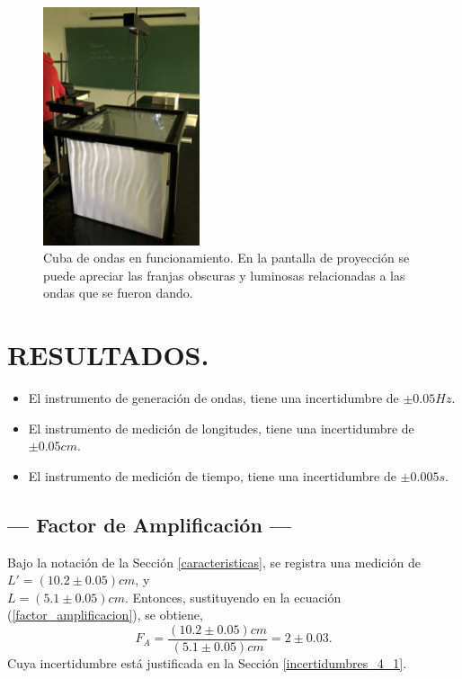 \documentclass[12pt,a4paper]{article}
\begin{document}
\begin{figure}[ht]
	\centering
	\includegraphics[height = 7cm]{IMAGENES/images/image5}
	\caption{Cuba de ondas en funcionamiento. En la pantalla de proyección se puede apreciar las franjas obscuras y luminosas relacionadas a las ondas que se fueron dando.}
\end{figure}
\newpage

\section{RESULTADOS.} %

\begin{itemize}[noitemsep]
	\item El instrumento de generación de ondas, tiene una incertidumbre de \(\pm 0.05Hz\).
	\item El instrumento de medición de longitudes, tiene una incertidumbre de \(\pm 0.05cm\).
	\item El instrumento de medición de tiempo, tiene una incertidumbre de \(\pm 0.005s\).
\end{itemize}

\subsection{--- Factor de Amplificación ---} %
\label{sub:factor_ampli}
Bajo la notación de la Sección \ref{caracteristicas}, se registra una medición de \(L ' = (10.2 \pm 0.05)cm\), y\\\(L = (5.1 \pm 0.05)cm\). Entonces, sustituyendo en la ecuación (\ref{factor_amplificacion}), se obtiene,
\[
	F_A = \dfrac{(10.2 \pm 0.05) cm}{(5.1 \pm 0.05) cm} = 2 \pm 0.03.
\]
Cuya incertidumbre está justificada en la Sección \ref{incertidumbres_4_1}.
\end{document}
